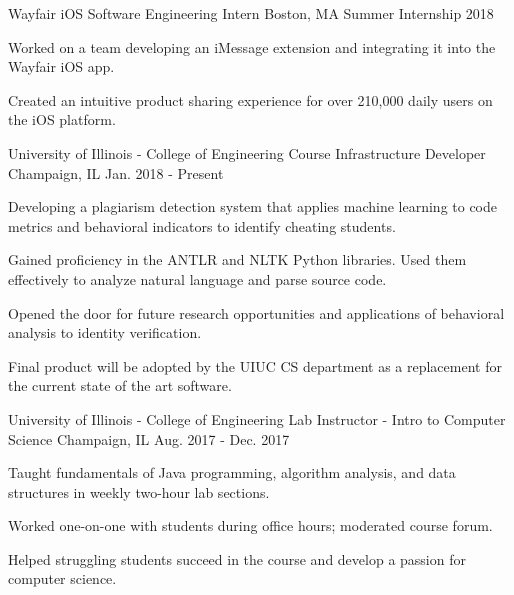 
\begin{cventries}
\cventry
{Wayfair} %
{iOS Software Engineering Intern} %
{Boston, MA} %
{Summer Internship 2018} %
{
	\begin{cvitems} %
		\item {Worked on a team developing an iMessage extension and integrating it into the Wayfair iOS app.}
		\item {Created an intuitive product sharing experience for over 210,000 daily users on the iOS platform.}
	\end{cvitems}
}
\cventry
{University of Illinois - College of Engineering} %
{Course Infrastructure Developer} %
{Champaign, IL} %
{Jan. 2018 - Present} %
{
    \begin{cvitems} %
        \item {Developing a plagiarism detection system that applies machine learning to code metrics and behavioral indicators to identify cheating students.}
        \item {Gained proficiency in the ANTLR and NLTK Python libraries. Used them effectively to analyze natural language and parse source code.}
       \item {Opened the door for future research opportunities and applications of behavioral analysis to identity verification.}
       \item {Final product will be adopted by the UIUC CS department as a replacement for the current state of the art software.}
    \end{cvitems}
}
\cventry
{University of Illinois - College of Engineering} %
{\newline Lab Instructor - Intro to Computer Science} %
{Champaign, IL} %
{Aug. 2017 - Dec. 2017} %
{
	\begin{cvitems} %
		\item {Taught fundamentals of Java programming, algorithm analysis, and data structures in weekly two-hour lab sections.}
		\item {Worked one-on-one with students during office hours; moderated course forum.}
		\item {Helped struggling students succeed in the course and develop a passion for computer science.}
	\end{cvitems}
}
\end{cventries}

